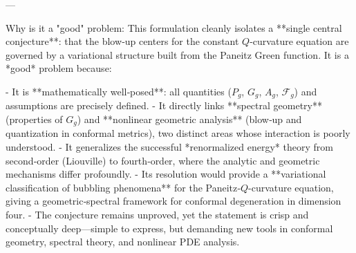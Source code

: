 ---

Why is it a "good" problem:  
This formulation cleanly isolates a **single central conjecture**:  
that the blow‑up centers for the constant \(Q\)-curvature equation are governed by a variational structure built from the Paneitz Green function. It is a *good* problem because:

- It is **mathematically well‑posed**: all quantities (\(P_g\), \(G_g\), \(A_g\), \(\mathcal F_g\)) and assumptions are precisely defined.  
- It directly links **spectral geometry** (properties of \(G_g\)) and **nonlinear geometric analysis** (blow‑up and quantization in conformal metrics), two distinct areas whose interaction is poorly understood.  
- It generalizes the successful *renormalized energy* theory from second‑order (Liouville) to fourth‑order, where the analytic and geometric mechanisms differ profoundly.  
- Its resolution would provide a **variational classification of bubbling phenomena** for the Paneitz‑\(Q\)-curvature equation, giving a geometric‑spectral framework for conformal degeneration in dimension four.  
- The conjecture remains unproved, yet the statement is crisp and conceptually deep—simple to express, but demanding new tools in conformal geometry, spectral theory, and nonlinear PDE analysis.